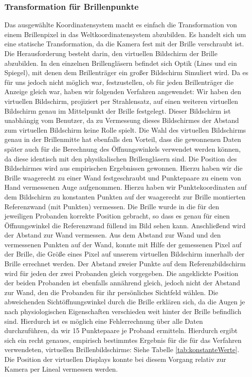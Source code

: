 \subsubsection*{Transformation für Brillenpunkte}
Das ausgewählte Koordinatensystem macht es einfach die Transformation von einem Brillenpixel in das Weltkoordinatensystem abzubilden. 
Es handelt sich um eine statische Transformation, da die Kamera fest mit der Brille verschraubt ist. 
Die Herausforderung besteht darin, den virtuellen Bildschirm der Brille abzubilden. In den einzelnen Brillengläsern befindet sich Optik (Lines und ein Spiegel), mit denen dem Brillenträger ein großer Bildschirm Simuliert wird. 
Da es für uns jedoch nicht möglich war, festzustellen, ob für jeden Brillenträger die Anzeige gleich war, haben wir folgenden Verfahren angewendet: 
Wir haben den virtuellen Bildschirm, projiziert per Strahlensatz, auf einen weiteren virtuellen Bildschirm genau im Mittelpunkt der Brille festgelegt. 
Dieser Bildschirm ist unabhängig vom Benutzer, da zu Vermessung dieses Bildschirmes der Abstand zum virtuellen Bildschirm keine Rolle spielt.
Die Wahl des virtuellen Bildschirms genau in der Brillenmitte hat ebenfalls den Vorteil, dass die gewonnenen Daten später auch für die Berechnung des Öffnungswinkels verwendet werden können, da diese identisch mit den physikalischen Brillengläsern sind.
Die Position des Bildschirmes wird aus empirischen Ergebnissen gewonnen. 
Hierzu haben wir die Brille waagerecht zu einer Wand festgeschraubt und Punktepaare zu einem von Hand vermessenen Auge aufgenommen. 
Hierzu haben wir Punktekoordinaten auf dem Bildschirm zu konstanten Punkten auf der waagerecht zur Brille montierten Referenzwand (mit Punkten) vermessen. 
Die Brille wurde in die für den jeweiligen Probanden korrekte Position gebracht, so dass es genau für einen Öffnungswinkel die Referenzwand füllend im Bild sehen kann. 
Anschließend wird der Abstand zur Wand vermessen. 
Aus dem Abstand zur Wand und den vermessenen Punkten auf der Wand, konnte mit Hilfe der gemessenen Pixel auf der Brille, die Größe eines Pixel auf unserem virtuellen Bildschirm innerhalb der Brille errechnet werden. 
Der Abstand zweier Punkte auf dem Referenzbildschirm wird für jeden der zwei Probanden gleich vorgegeben. 
Die angeklickte Position der beiden Probanden ist ebenfalls annährend gleich, jedoch nicht der Abstand zur Wand, den die Probanden für ihr persönliches Sichtfeld wählen. 
Die abweichenden Sichtöffnungswinkel durch die Brille erklären sich, da die Augen je nach physiologischen Eigenschaften verschieden weit hinter der Brille befindlich sind. 
Hierdurch ist es möglich eine Fehlerrechnung über alle Daten durchzuführen, da wir 15 Punktepaare je Proband ermitteln. 
Hierdurch ergibt sich ein recht genaues, empirisch bestimmtes Ergebnis für die für das Verfahren verwendeten, virtuellen Brillenbildschirme: Siehe Tabelle \ref{tab:konstanteWerte}. 
Die Position der virtuellen Displays konnte bei diesem Vorgang relativ zur Kamera per Lineal vermessen werden.

